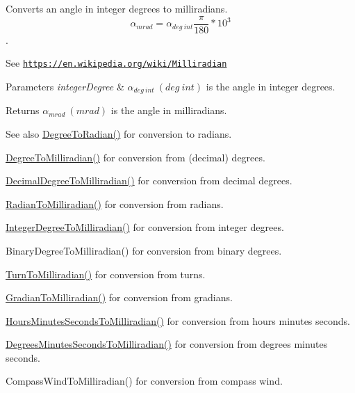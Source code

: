 Converts an angle in integer degrees to milliradians. \[\alpha_{mrad}=\alpha_{deg\ int}\frac{\pi}{180}*10^3\]. 

See \href{https://en.wikipedia.org/wiki/Milliradian}{\tt https\+://en.\+wikipedia.\+org/wiki/\+Milliradian} 
\begin{DoxyParams}{Parameters}
{\em integer\+Degree} & $\alpha_{deg\ int}\ (deg\ int)$ is the angle in integer degrees. \\
\hline
\end{DoxyParams}
\begin{DoxyReturn}{Returns}
$\alpha_{mrad}\ (mrad)$ is the angle in milliradians. 
\end{DoxyReturn}
\begin{DoxySeeAlso}{See also}
\mbox{\hyperlink{group___e_g_x_math-_angle_conversions-_degree_ga48585541b228c852c9d08a9eac3682f0}{Degree\+To\+Radian()}} for conversion to radians. 

\mbox{\hyperlink{group___e_g_x_math-_angle_conversions-_degree_gae4fa6c2d3805430760783650cfbfdb11}{Degree\+To\+Milliradian()}} for conversion from (decimal) degrees. 

\mbox{\hyperlink{group___e_g_x_math-_angle_conversions-_decimal_degree_gab567d02d4692d9642a4ad219e479713a}{Decimal\+Degree\+To\+Milliradian()}} for conversion from decimal degrees. 

\mbox{\hyperlink{group___e_g_x_math-_angle_conversions-_radian_gaea391f0cca39b05e298dd1cae162e7f1}{Radian\+To\+Milliradian()}} for conversion from radians. 

\mbox{\hyperlink{group___e_g_x_math-_angle_conversions-_integer_degree_ga5379a68bdff5cc4fab5bb1ba06ef9453}{Integer\+Degree\+To\+Milliradian()}} for conversion from integer degrees. 

Binary\+Degree\+To\+Milliradian() for conversion from binary degrees. 

\mbox{\hyperlink{group___e_g_x_math-_angle_conversions-_turn_ga2aea2621472294ce4c25ac7e55db51c6}{Turn\+To\+Milliradian()}} for conversion from turns. 

\mbox{\hyperlink{group___e_g_x_math-_angle_conversions-_gradian_ga144f1019dc760268a163d81fcb3ce482}{Gradian\+To\+Milliradian()}} for conversion from gradians. 

\mbox{\hyperlink{group___e_g_x_math-_angle_conversions-_hours_minutes_seconds_gad78a90abaed52ca9d5fe6b4287c4a5f3}{Hours\+Minutes\+Seconds\+To\+Milliradian()}} for conversion from hours minutes seconds. 

\mbox{\hyperlink{group___e_g_x_math-_angle_conversions-_degrees_minutes_seconds_gacadb912be6af5dac1db702db86a69eeb}{Degrees\+Minutes\+Seconds\+To\+Milliradian()}} for conversion from degrees minutes seconds. 

Compass\+Wind\+To\+Milliradian() for conversion from compass wind. 
\end{DoxySeeAlso}
\mbox{\label{group___e_g_x_math-_angle_conversions-_integer_degree_ga05d3368b00ea27b9895de2ffe5c8df38}} 

